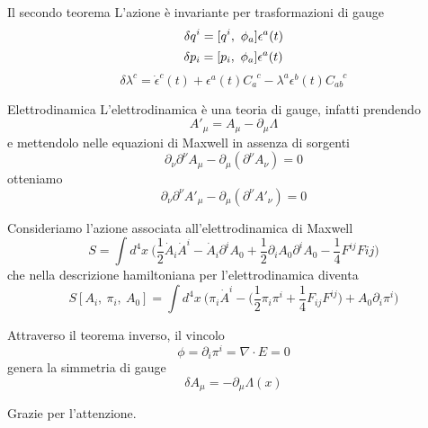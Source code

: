\begin{frame}{Il secondo teorema}
    L'azione è invariante per trasformazioni di gauge
    \begin{equation} \label{gaugee1}
        \delta q^i = [q^i, ~\phi_a] \epsilon^a (t)
    \end{equation}
    \begin{equation}\label{gaugee2}
        \delta p_i = [p_i, ~\phi_a] \epsilon^a (t)
    \end{equation}
    \begin{equation}\label{gaugee3}
        \delta \lambda^c = \dot \epsilon^c (t) + \epsilon^a(t) C_a^{\phantom a c} - \lambda^a \epsilon^b(t) C_{ab}^{\phantom{ab} c}
    \end{equation}  

\end{frame}

\begin{frame} {Elettrodinamica}
    L'elettrodinamica è una teoria di gauge, infatti prendendo 
    \begin{equation*}
        A'_\mu = A_\mu - \partial_\mu \Lambda
    \end{equation*}
    e mettendolo nelle equazioni di Maxwell in assenza di sorgenti
    \begin{equation*}
        \partial_\nu \partial^\nu A_\mu - \partial_\mu (\partial^\nu A_\nu) = 0
    \end{equation*}
    otteniamo 
    \begin{equation*}
        \partial_\nu \partial^\nu A'_\mu - \partial_\mu (\partial^\nu A'_\nu) = 0
    \end{equation*}

\end{frame}

\begin{frame}
    Consideriamo l'azione associata all'elettrodinamica di Maxwell
    \begin{equation*}
        S = \int d^4 x ~ \Big (\frac{1}{2} \dot A_i \dot A^i - \dot A_i \partial^i A_0 + \frac{1}{2} \partial_i A_0 \partial^i A_0 - \frac{1}{4} F^{ij} F{ij} \Big )
    \end{equation*} 
    che  nella descrizione hamiltoniana per l'elettrodinamica diventa
    \begin{equation*}
        S[A_i, ~\pi_i, ~A_0] = \int d^4 x ~ \Big ( \pi_i \dot A^i - \Big ( \frac{1}{2} \pi_i \pi^i + \frac{1}{4} F_{ij} F^{ij} \Big) + A_0 \partial_i \pi^i \Big)
    \end{equation*}

    Attraverso il teorema inverso, il vincolo
    \begin{equation*}
        \phi = \partial_i \pi^i = \nabla \cdot E = 0
    \end{equation*}
    genera la simmetria di gauge
    \begin{equation*}
        \delta A_\mu = - \partial_\mu \Lambda(x)
    \end{equation*}

\end{frame}

\begin{frame}
   \begin{center}
        Grazie per l'attenzione.
   \end{center} 
\end{frame}

